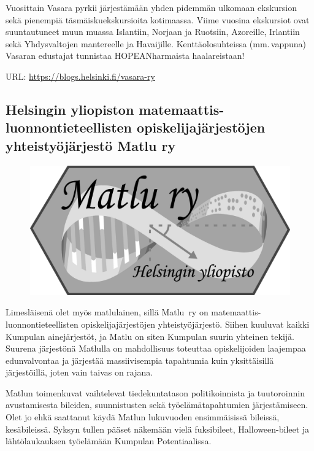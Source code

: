 \documentclass[a5paper, 8pt, twocolumn]{book} %
\numberwithin{equation}{section}
\begin{document}
Vuosittain Vasara pyrkii järjestämään
yhden pidemmän ulkomaan ekskursion
sekä pienempiä täsmä\-isku\-ekskursioita kotimaassa.
Viime vuosina ekskursiot ovat
suuntautuneet muun muassa Islantiin, Norjaan
ja Ruotsiin, Azoreille, Irlantiin sekä
Yhdysvaltojen mantereelle ja Havaijille.
Kenttäolosuhteissa (mm.\,vappuna) Vasaran
edustajat tunnistaa HOPEANharmaista
haalareistaan!

\noindent URL: \url{https://blogs.helsinki.fi/vasara-ry}

\subsection*{Helsingin yliopiston matemaattis-luonnontieteellisten opiskelijajärjestöjen yhteistyöjärjestö Matlu ry}
\begin{figure}[!b]
	\centering
	\includegraphics[width=\columnwidth]{matlu.png}
\end{figure}
Limesläisenä olet myös matlulainen,
sillä Matlu~ry on matemaattis-luonnon\-tieteellisten
opiskelija\-järjestöjen yhteis\-työ\-järjestö.
Siihen kuuluvat kaikki Kumpulan
aine\-järjestöt, ja Matlu on siten Kumpulan suurin yhteinen tekijä.
Suurena järjestönä Matlulla on mahdollisuus
toteuttaa opiskelijoiden laajempaa edunvalvontaa ja
järjestää massiivisempia tapahtumia
kuin yksittäisillä järjestöillä, joten
vain taivas on rajana.

Matlun toimenkuvat vaihtelevat tiedekuntatason
politikoinnista ja tuutoroinnin avustamisesta
bileiden, suunnistusten sekä työelämätapahtumien
järjestämiseen. Olet jo ehkä saattanut käydä Matlun lukuvuoden
ensimmäisissä bileissä, kesäbileissä. Syksyn tullen pääset
näkemään vielä fuksibileet, Halloween-bileet ja
lähtölaukauksen työelämään Kumpulan Potentiaalissa.
\end{document}
